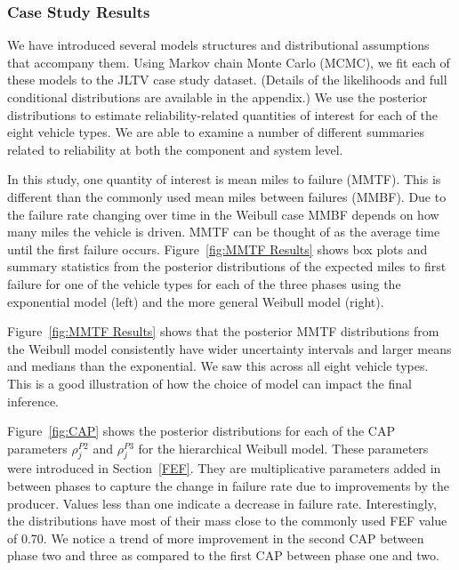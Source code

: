 \documentclass[12pt]{article}
\begin{document}
\subsubsection{Case Study Results}
We have introduced several models structures and distributional assumptions that accompany them.  Using Markov chain Monte Carlo (MCMC), we fit each of these models to the JLTV case study
dataset. (Details of the likelihoods and full conditional distributions are available in the appendix.) We use the posterior distributions to estimate reliability-related quantities of interest for each of the eight vehicle types.  We are able to examine a number of different summaries related to reliability at both the component and system level.

In this study, one quantity of interest is mean miles to failure (MMTF). This is different than the commonly used mean miles between failures (MMBF).  Due to the failure rate changing over time in the Weibull case MMBF depends on how many miles the vehicle is driven.  MMTF can be thought of as the average time until the first failure occurs. Figure~\ref{fig:MMTF Results} shows box plots and summary statistics from the posterior distributions of the expected miles to first failure for one of the vehicle types for each of the three phases using the exponential model (left) and the more general Weibull model (right).

Figure~\ref{fig:MMTF Results} shows that the posterior MMTF distributions from the Weibull model consistently have wider uncertainty intervals and larger means and medians than the exponential.  We saw this across all eight vehicle types.  This is a good illustration of how the choice of model can impact the final inference.

Figure~\ref{fig:CAP} shows the posterior distributions for each of the CAP parameters $\rho_{j}^{P2}$ and $\rho_{j}^{P3}$ for the hierarchical Weibull model.  These parameters were introduced in Section~\ref{FEF}.  They are multiplicative parameters added in between phases to capture the change in failure rate due to improvements by the producer.  Values less than one indicate a decrease in failure rate. Interestingly, the distributions have most of their mass close to the commonly used FEF value of 0.70.  We notice a trend of more improvement in the second CAP between phase two and three as compared to the first CAP between phase one and two.
\end{document}
